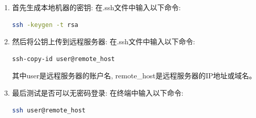 \begin{enumerate}[1.]
	\item 首先生成本地机器的密钥:
	      在.ssh文件中输入以下命令:
	      \begin{lstlisting}[language=bash]
ssh -keygen -t rsa
\end{lstlisting}
	\item 然后将公钥上传到远程服务器:
	      在.ssh文件中输入以下命令:
	      \begin{lstlisting}[language=bash]
ssh-copy-id user@remote_host
\end{lstlisting}
	      其中user是远程服务器的账户名, remote\_host是远程服务器的IP地址或域名。
	\item 最后测试是否可以无密码登录:
	      在终端中输入以下命令:
	      \begin{lstlisting}[language=bash]
ssh user@remote_host
\end{lstlisting}
\end{enumerate}

